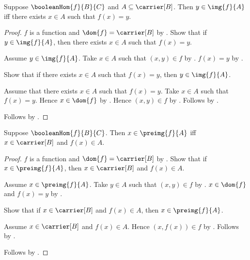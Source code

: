 \begin{proposition}\label{boolean_hom_image_iff}
    Suppose $\booleanHom{f}{B}{C}$ and $A\subseteq\carrier[B]$.
    Then $y\in\img{f}{A}$ iff
        there exists $x\in A$ such that $f(x)=y$.
\end{proposition}
\begin{proof}
    $f$ is a function and $\dom{f}=\carrier[B]$ by
        .
    Show that if $y\in\img{f}{A}$, then there exists $x\in A$
        such that $f(x)=y$.
    \begin{subproof}
        Assume $y\in\img{f}{A}$.
        Take $x\in A$ such that $(x,y)\in f$ by .
        $f(x)=y$ by .
    \end{subproof}
    Show that if there exists $x\in A$ such that $f(x)=y$, then
        $y\in\img{f}{A}$.
    \begin{subproof}
        Assume that there exists $x\in A$ such that $f(x)=y$.
        Take $x\in A$ such that $f(x)=y$.
        Hence $x\in\dom{f}$ by .
        Hence $(x,y)\in f$ by .
        Follows by .
    \end{subproof}
    Follows by \auto.
\end{proof}

\begin{proposition}\label{boolean_hom_preimage_iff}
    Suppose $\booleanHom{f}{B}{C}$.
    Then $x\in\preimg{f}{A}$ iff
        $x\in\carrier[B]$ and $f(x)\in A$.
\end{proposition}
\begin{proof}
    $f$ is a function and $\dom{f}=\carrier[B]$ by
        .
    Show that if $x\in\preimg{f}{A}$, then
        $x\in\carrier[B]$ and $f(x)\in A$.
    \begin{subproof}
        Assume $x\in\preimg{f}{A}$.
        Take $y\in A$ such that $(x,y)\in f$ by
            .
        $x\in\dom{f}$ and $f(x)=y$ by
            .
    \end{subproof}
    Show that if $x\in\carrier[B]$ and $f(x)\in A$, then
        $x\in\preimg{f}{A}$.
    \begin{subproof}
        Assume $x\in\carrier[B]$ and $f(x)\in A$.
        Hence $(x,f(x))\in f$ by .
        Follows by .
    \end{subproof}
    Follows by \auto.
\end{proof}

